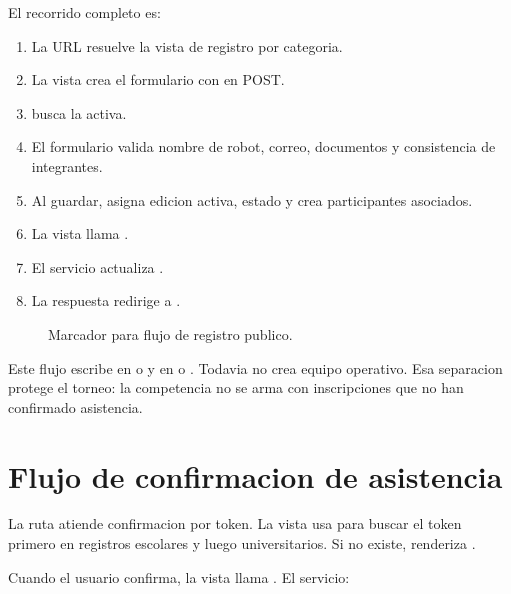 El recorrido completo es:

\begin{enumerate}
  \item La URL resuelve la vista de registro por categoria.
  \item La vista crea el formulario con  en POST.
  \item {} busca la  activa.
  \item El formulario valida nombre de robot, correo, documentos y consistencia de integrantes.
  \item Al guardar, asigna edicion activa, estado  y crea participantes asociados.
  \item La vista llama .
  \item El servicio actualiza .
  \item La respuesta redirige a .
\end{enumerate}

\begin{figure}[H]
  \centering
  \caption{Marcador para flujo de registro publico.}
  \label{fig:uvf-flujo-registro}
\end{figure}

Este flujo escribe en  o  y en  o . Todavia no crea equipo operativo. Esa separacion protege el torneo: la competencia no se arma con inscripciones que no han confirmado asistencia.

\section{Flujo de confirmacion de asistencia}
\label{sec:uvf-confirmacion-asistencia}

La ruta  atiende confirmacion por token. La vista  usa  para buscar el token primero en registros escolares y luego universitarios. Si no existe, renderiza .

Cuando el usuario confirma, la vista llama . El servicio:

